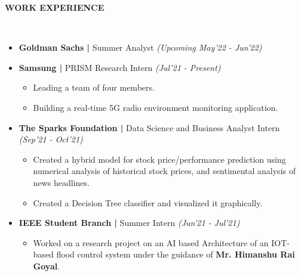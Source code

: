 \documentclass[a4paper,10pt]{article}
\newcommand{\lsep}{-0.5cm}
\newcommand{\resheading}[1]{{\small \colorbox{mygrey}{\begin{minipage}{0.975\textwidth}{\textbf{#1 \vphantom{p\^{E}}}}\end{minipage}}}}
\begin{document}
\resheading{\textbf{WORK EXPERIENCE} }\\[\lsep]
\begin{itemize}
\setlength\itemsep{0em}
\item \textbf{Goldman Sachs |} Summer Analyst \textit{(Upcoming May'22 - Jun'22)}
\item \textbf{Samsung |} PRISM Research Intern \textit{(Jul'21 - Present)}
\begin{itemize}
\setlength\itemsep{0.1em}
\item Leading a team of four members.
\item Building a real-time 5G radio environment monitoring application.
\end{itemize}
\item \textbf{The Sparks Foundation |} Data Science and Business Analyst Intern \textit{(Sep'21 - Oct'21)}
\begin{itemize}
\setlength\itemsep{0.1em}
\item Created a hybrid model for stock price/performance prediction using numerical analysis of historical stock prices, and sentimental analysis of news headlines.
\item Created a Decision Tree classifier and visualized it graphically.
\end{itemize}
\item \textbf{IEEE Student Branch |}  Summer Intern \textit{(Jun'21 - Jul'21)}
\begin{itemize}
\setlength\itemsep{0.1em}
\item Worked on a research project on an AI based Architecture of an IOT-based flood control system under the guidance of \textbf{Mr. Himanshu Rai Goyal}.
\end{itemize}
\end{itemize}
\end{document}

